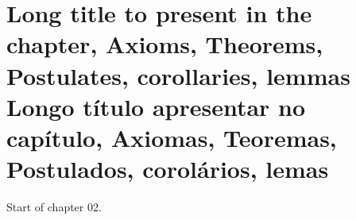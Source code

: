 

\chapter[\lang{Abbreviation for the Table of Contents}{Abreviação para o Sumário}]
 {
  \lang
  {Long title to present in the chapter, Axioms, Theorems, Postulates, corollaries, lemmas}
  {Longo título apresentar no capítulo, Axiomas, Teoremas, Postulados, corolários, lemas}
 }

\label{chapter_02}

Start of chapter 02.






